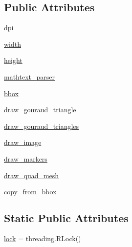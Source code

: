 \subsection*{Public Attributes}
\begin{DoxyCompactItemize}
\item 
\hyperlink{classmatplotlib_1_1backends_1_1backend__agg_1_1RendererAgg_a6042792c0f90a0dd7a964f9de1b5bfca}{dpi}
\item 
\hyperlink{classmatplotlib_1_1backends_1_1backend__agg_1_1RendererAgg_a560412f63564c0fc881c5a7d7d9a3d9c}{width}
\item 
\hyperlink{classmatplotlib_1_1backends_1_1backend__agg_1_1RendererAgg_a6c751ab022decc0e421880a526a21822}{height}
\item 
\hyperlink{classmatplotlib_1_1backends_1_1backend__agg_1_1RendererAgg_a433c8f62e4329382656077b05d814bc6}{mathtext\+\_\+parser}
\item 
\hyperlink{classmatplotlib_1_1backends_1_1backend__agg_1_1RendererAgg_a37b101db0879f86811262c091aa7da8d}{bbox}
\item 
\hyperlink{classmatplotlib_1_1backends_1_1backend__agg_1_1RendererAgg_a7f6e8e48da5540591bd42558f4bd0c84}{draw\+\_\+gouraud\+\_\+triangle}
\item 
\hyperlink{classmatplotlib_1_1backends_1_1backend__agg_1_1RendererAgg_a7a5531c6d290f25158542efde2410b6e}{draw\+\_\+gouraud\+\_\+triangles}
\item 
\hyperlink{classmatplotlib_1_1backends_1_1backend__agg_1_1RendererAgg_a2bcc507473dd6ebc8dff41fabc6ba9be}{draw\+\_\+image}
\item 
\hyperlink{classmatplotlib_1_1backends_1_1backend__agg_1_1RendererAgg_a100a8a177619bf1aea498878d6321a5e}{draw\+\_\+markers}
\item 
\hyperlink{classmatplotlib_1_1backends_1_1backend__agg_1_1RendererAgg_a868704a6518e7c97a1bf43d645f59a0f}{draw\+\_\+quad\+\_\+mesh}
\item 
\hyperlink{classmatplotlib_1_1backends_1_1backend__agg_1_1RendererAgg_af206ab706d47fcec07919fbe9ca32370}{copy\+\_\+from\+\_\+bbox}
\end{DoxyCompactItemize}
\subsection*{Static Public Attributes}
\begin{DoxyCompactItemize}
\item 
\hyperlink{classmatplotlib_1_1backends_1_1backend__agg_1_1RendererAgg_a97c699e0bbcc70da9f2735fc73dde27b}{lock} = threading.\+R\+Lock()
\end{DoxyCompactItemize}


